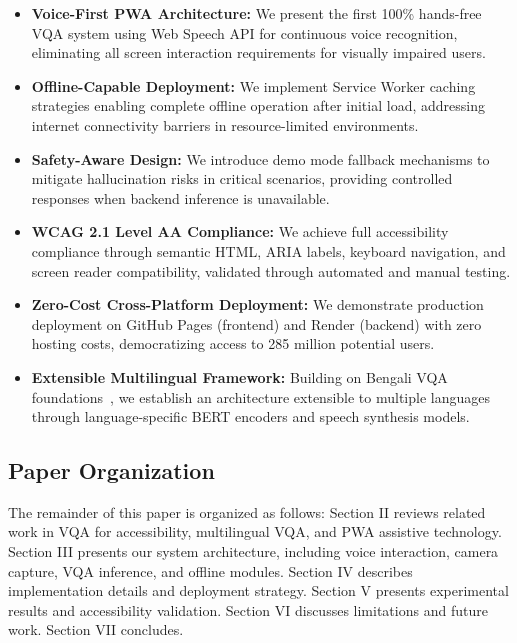 \documentclass[conference]{IEEEtran}
\begin{document}
\begin{itemize}
    \item \textbf{Voice-First PWA Architecture:} We present the first 100\% hands-free VQA system using Web Speech API for continuous voice recognition, eliminating all screen interaction requirements for visually impaired users.
    
    \item \textbf{Offline-Capable Deployment:} We implement Service Worker caching strategies enabling complete offline operation after initial load, addressing internet connectivity barriers in resource-limited environments.
    
    \item \textbf{Safety-Aware Design:} We introduce demo mode fallback mechanisms to mitigate hallucination risks in critical scenarios, providing controlled responses when backend inference is unavailable.
    
    \item \textbf{WCAG 2.1 Level AA Compliance:} We achieve full accessibility compliance through semantic HTML, ARIA labels, keyboard navigation, and screen reader compatibility, validated through automated and manual testing.
    
    \item \textbf{Zero-Cost Cross-Platform Deployment:} We demonstrate production deployment on GitHub Pages (frontend) and Render (backend) with zero hosting costs, democratizing access to 285 million potential users.
    
    \item \textbf{Extensible Multilingual Framework:} Building on Bengali VQA foundations~\cite{bengali_vqa_2024}, we establish an architecture extensible to multiple languages through language-specific BERT encoders and speech synthesis models.
\end{itemize}

\subsection{Paper Organization}

The remainder of this paper is organized as follows: Section II reviews related work in VQA for accessibility, multilingual VQA, and PWA assistive technology. Section III presents our system architecture, including voice interaction, camera capture, VQA inference, and offline modules. Section IV describes implementation details and deployment strategy. Section V presents experimental results and accessibility validation. Section VI discusses limitations and future work. Section VII concludes.
\end{document}
